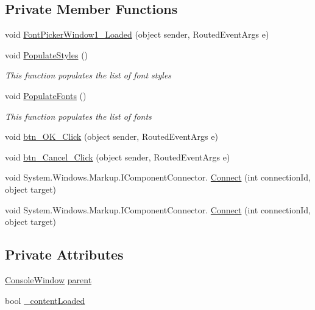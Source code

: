\subsection*{Private Member Functions}
\begin{DoxyCompactItemize}
\item 
void \hyperlink{class_c_p_u___o_s___simulator_1_1_font_picker_window_a0907f73fb52351e43b76af4137509f41}{Font\+Picker\+Window1\+\_\+\+Loaded} (object sender, Routed\+Event\+Args e)
\item 
void \hyperlink{class_c_p_u___o_s___simulator_1_1_font_picker_window_a79525d7a77c191f63187e5a8181bd197}{Populate\+Styles} ()
\begin{DoxyCompactList}\small\item\em This function populates the list of font styles \end{DoxyCompactList}\item 
void \hyperlink{class_c_p_u___o_s___simulator_1_1_font_picker_window_a4042c1d9dedbbd9abb956fc7b97c1564}{Populate\+Fonts} ()
\begin{DoxyCompactList}\small\item\em This function populates the list of fonts \end{DoxyCompactList}\item 
void \hyperlink{class_c_p_u___o_s___simulator_1_1_font_picker_window_a6d659d671c24e1beed969f2d36d669d8}{btn\+\_\+\+O\+K\+\_\+\+Click} (object sender, Routed\+Event\+Args e)
\item 
void \hyperlink{class_c_p_u___o_s___simulator_1_1_font_picker_window_a6e5279d2116523168362cb740eac5e55}{btn\+\_\+\+Cancel\+\_\+\+Click} (object sender, Routed\+Event\+Args e)
\item 
void System.\+Windows.\+Markup.\+I\+Component\+Connector. \hyperlink{class_c_p_u___o_s___simulator_1_1_font_picker_window_ac5f7c5cad6bf2d8dc79c7e59f5a125da}{Connect} (int connection\+Id, object target)
\item 
void System.\+Windows.\+Markup.\+I\+Component\+Connector. \hyperlink{class_c_p_u___o_s___simulator_1_1_font_picker_window_ac5f7c5cad6bf2d8dc79c7e59f5a125da}{Connect} (int connection\+Id, object target)
\end{DoxyCompactItemize}
\subsection*{Private Attributes}
\begin{DoxyCompactItemize}
\item 
\hyperlink{class_c_p_u___o_s___simulator_1_1_console_window}{Console\+Window} \hyperlink{class_c_p_u___o_s___simulator_1_1_font_picker_window_a4e59cc593e060f3229adc8decfeb151c}{parent}
\item 
bool \hyperlink{class_c_p_u___o_s___simulator_1_1_font_picker_window_aa37d57c41c80a6fa875193d68754f658}{\+\_\+content\+Loaded}
\end{DoxyCompactItemize}


